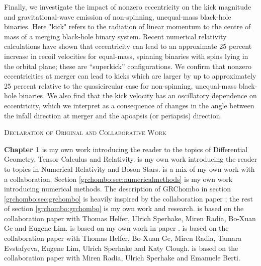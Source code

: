 \documentclass[11pt]{report}  %
\numberwithin{equation}{section}
\begin{document}
Finally, we investigate the impact of nonzero eccentricity on the kick magnitude and gravitational-wave emission of non-spinning, unequal-mass black-hole binaries. Here "kick" refers to the radiation of linear momentum to the centre of mass of a merging black-hole binary system. Recent numerical relativity calculations have shown that eccentricity can lead to an approximate 25 percent increase in recoil velocities for equal-mass, spinning binaries with spins lying in the orbital plane; these are “superkick” configurations. We confirm that nonzero eccentricities at merger can lead to kicks which are larger by up to approximately 25 percent relative to the quasicircular case for non-spinning, unequal-mass black-hole binaries. We also find that the kick velocity has an oscillatory dependence on eccentricity, which we interpret as a consequence of changes in the angle between the infall direction at merger and the apoapsis (or periapsis) direction.

\vspace{2cm}




\newpage



  {\centering
  \scshape\LARGE Declaration of Original and Collaborative Work  \par}
  \vspace{1cm}

                         {\bf Chapter 1} is my own work introducing the reader to the topics of Differential Geometry, Tensor Calculus and Relativity.
  \vspace{0.5cm} is my own work introducing the reader to topics in Numerical Relativity and Boson Stars.
  \vspace{0.5cm} is a mix of my own work with a collaboration. Section \ref{grchombo:sec:numericalmethods} is my own work introducing numerical methods. The description of {\sc GRChombo} in section \ref{grchombo:sec:grchombo} is heavily inspired by the collaboration paper \cite{Andrade2021}; the rest of section \ref{grchombo:grchombo} is my own work and research.
  \vspace{0.5cm} is based on the collaboration paper \cite{Helfer:2021brt} with Thomas Helfer, Ulrich Sperhake, Miren Radia, Bo-Xuan Ge and Eugene Lim.
  \vspace{0.5cm} is based on my own work in paper \cite{Croft:2022gks}.
  \vspace{0.5cm} is based on the collaboration paper \cite{croft2022gravitational} with Thomas Helfer, Bo-Xuan Ge, Miren Radia, Tamara Evstafyeva, Eugene Lim, Ulrich Sperhake and Katy Clough.
  \vspace{0.5cm} is based on the collaboration paper \cite{Radia:2021hjs} with Miren Radia, Ulrich Sperhake and Emanuele Berti.
\end{document}
